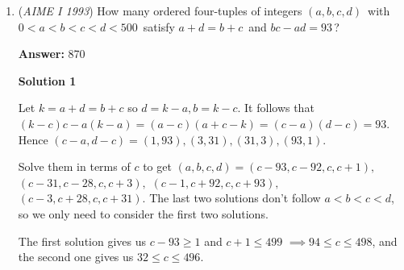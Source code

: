 \begin{enumerate}
Let $f$ be the total number of fish caught by the contestants who didn't catch $0, 1, 2, 3, 13, 14$, or $15$ fish and let $a$ be the number of contestants who didn't catch $0, 1, 2, 3, 13, 14$, or $15$ fish. From $\text{(b)}$, we know that $\frac{69+f+65+28+15}{a+31}=6\implies f=6a+9$. From $\text{(c)}$ we have $\frac{f+69+14+5}{a+44}=5\implies f=5a+132$. Using these two equations gets us $a=123$. Plug this back into the equation to get $f=747$. Thus, the total number of fish caught is $5+14+69+f+65+28+15=\boxed{943}$ - Heavytoothpaste

 



\textbf{Solution 3}

Let $x$ be the average number of fish caught among $n$ of those who caught $4$ to $12$ fishes. According to statement B:
 \[\frac{xn + 3 \cdot 23 + 13 \cdot 5 + 14 \cdot 2 + 15}{n + 31} = 6\]
 \[\implies xn - 6n = 9\]According to statement C:
 \[\frac{xn + 0 \cdot 9 + 1 \cdot 5 + 2 \cdot 7 + 3 \cdot 23}{n + 44} = 5\]
 \[\implies xn - 5n = 132\]We then solve for $n$ and then $xn$. Note $xn$ is the number of fish caught by the $n$ people we defined above.
 \[n = 123\]
 \[xn = 132 + 5(123) = 747\]Thus, the total number of fish caught is
 \[747 + 1 \cdot 5 + 2 \cdot 7 + 3 \cdot 23 + 13 \cdot 5 + 14 \cdot 2 + 15 \cdot 1 = \boxed{943}\] ~Totient4Breakfast

 


	\item (\textit{AIME I 1993}) How many ordered four-tuples of integers $(a,b,c,d)\,$ with $0 < a < b < c < d < 500\,$ satisfy $a + d = b + c\,$ and $bc - ad = 93\,$?


 
 \textbf{Answer: }870



\textbf{Solution 1}

Let $k = a + d = b + c$ so $d = k-a, b=k-c$. It follows that $(k-c)c - a(k-a) = (a-c)(a+c-k) = (c-a)(d-c) = 93$. Hence $(c - a,d - c) = (1,93),(3,31),(31,3),(93,1)$.

 Solve them in terms of $c$ to get $(a,b,c,d) = (c - 93,c - 92,c,c + 1),$ $(c - 31,c - 28,c,c + 3),$ $(c - 1,c + 92,c,c + 93),$ $(c - 3,c + 28,c,c + 31)$. The last two solutions don't follow $a < b < c < d$, so we only need to consider the first two solutions.

 The first solution gives us $c - 93\geq 1$ and $c + 1\leq 499$ $\implies 94\leq c\leq 498$, and the second one gives us $32\leq c\leq 496$.


\end{enumerate}
